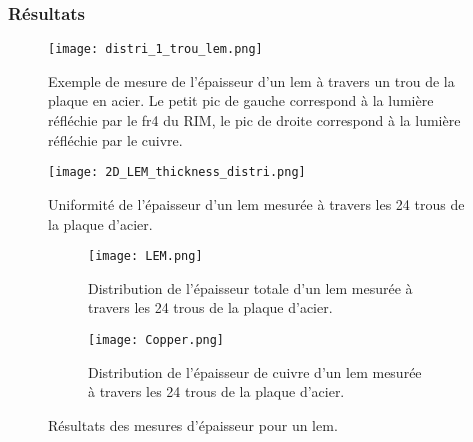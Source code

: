       \subsubsection{Résultats}\label{sec::thickness_result}
         
        \begin{figure}[htpb]
          \centering
          \texttt{[image: distri\_1\_trou\_lem.png]}
          \caption[Exemple de mesure de l'épaisseur d'un LEM]{\label{fig::distri_1_trou_lem}Exemple de mesure de l'épaisseur d'un \gls{lem} à travers un trou de la plaque en acier. Le petit pic de gauche correspond à la lumière réfléchie par le \gls{fr4} du RIM, le pic de droite correspond à la lumière réfléchie par le cuivre.}
        \end{figure}
        \begin{figure}[htpb]
          \centering
          \texttt{[image: 2D\_LEM\_thickness\_distri.png]}
          \caption[Uniformité de l'épaisseur d'un LEM]{\label{fig::distri_24_trou_lem_2D}Uniformité de l'épaisseur d'un \gls{lem} mesurée à travers les 24 trous de la plaque d'acier.}
        \end{figure}
          
        \begin{figure}[htpb]
          \begin{subfigure}[b]{0.48\textwidth}
            \texttt{[image: LEM.png]}
            \caption{\label{fig::distri_24_trou_lem_1D}Distribution de l'épaisseur totale d'un \gls{lem} mesurée à travers les 24 trous de la plaque d'acier.}
          \end{subfigure}
          \hfill
          \begin{subfigure}[b]{0.48\textwidth}
            \texttt{[image: Copper.png]}
            \caption{\label{fig::distri_24_trou_cuivre_1D}Distribution de l'épaisseur de cuivre d'un \gls{lem} mesurée à travers les 24 trous de la plaque d'acier.}
          \end{subfigure}
          \caption[Résultats des mesures d'épaisseur pour un LEM]{\label{fig::distri_epaisseur_1_lem}Résultats des mesures d'épaisseur pour un \gls{lem}.}
        \end{figure}
                
